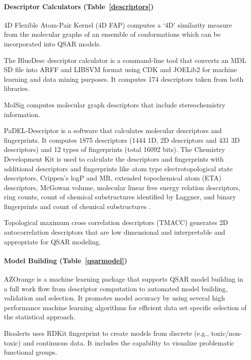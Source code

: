 \paragraph{Descriptor Calculators (Table~\ref{descriptors})}
4D Flexible Atom-Pair Kernel (4D FAP) computes a `4D' similarity measure from the molecular graphs of an ensemble of conformations which can be incorporated into QSAR models.

The BlueDesc descriptor calculator is a command-line tool that converts an MDL SD file into ARFF and LIBSVM format using CDK and JOELib2 for machine learning and data mining purposes. It computes 174 descriptors taken from both libraries.

MolSig \cite{Carbonell_2013} computes molecular graph descriptors that include stereochemistry information.

PaDEL-Descriptor  \cite{Yap_2010} is a software that calculates molecular descriptors and fingerprints. It computes 1875 descriptors (1444 1D, 2D descriptors and 431 3D descriptors) and 12 types of fingerprints (total 16092 bits). The Chemistry Development Kit is used to calculate the descriptors and fingerprints with additional descriptors and fingerprints like atom type electrotopological state descriptors, Crippen's logP and MR, extended topochemical atom (ETA) descriptors, McGowan volume, molecular linear free energy relation descriptors, ring counts, count of chemical substructures identified by Laggner, and binary fingerprints and count of chemical substructures \cite{Yap_2010}.

Topological maximum cross correlation descriptors (TMACC) \cite{Melville_2007} generates 2D autocorrelation descriptors that are low dimensional and interpretable and appropriate for QSAR modeling.

\paragraph{Model Building (Table~\ref{qsarmodel})}
AZOrange \cite{St_lring_2011} is a machine learning package that supports QSAR model building in a full work flow from descriptor computation to automated model building, validation and selection. It promotes model accuracy by using several high performance machine learning algorithms for efficient data set specific selection of the statistical approach.

Bioalerts \cite{Cortes_Ciriano_2016} uses RDKit fingerprint to create models from discrete (e.g., toxic/non-toxic) and continuous data.  It includes the capability to visualize problematic functional groups.

